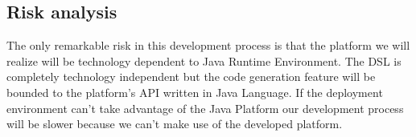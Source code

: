 \subsection{Risk analysis}
The only remarkable risk in this development process is that the platform we will realize will be technology dependent to Java Runtime Environment. The DSL is completely technology independent but the code generation feature will be bounded to the platform’s API written in Java Language. If the deployment environment can’t take advantage of the Java Platform our development process will be slower because we can’t make use of the developed platform.
